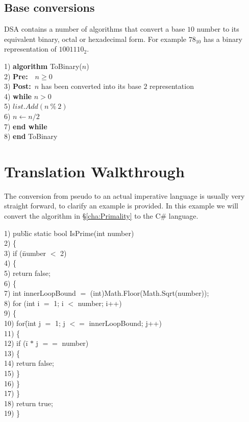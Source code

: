 \documentclass[10pt,oneside,a4paper]{report}
\begin{document}
\section{Base conversions}
DSA contains a number of algorithms that convert a base $10$ number to its equivalent binary, octal or hexadecimal form. For example $78_{10}$ has a binary representation of $1001110_{2}$.

\begin{tabbing}
1) \textbf{alg}\= \textbf{orithm} ToBinary($n$)\\
2) \> \textbf{Pre:}~~$n \geq 0$ \\
3) \> \textbf{Post:}~$n$ has been converted into its base $2$ representation \\
4) \> \textbf{whi}\= \textbf{le} $n > 0$\\
5) \> \> $list.Add(n~\%~2)$\\
6) \> \> $n \leftarrow n / 2$\\
7) \> \textbf{end while}\\
8) \textbf{end} ToBinary\\
\end{tabbing}

\appendix
\chapter{Translation Walkthrough}
The conversion from pseudo to an actual imperative language is usually very straight forward, to clarify an example is provided.
In this example we will convert the algorithm in \S\ref{cha:Primality} to the C\# language.

\begin{tabbing}
1) pub\=lic static bool IsPrime(int number) \\
2) \{ \\
3) \> if (\=number $<$ 2) \\
4) \> \{ \\
5) \> \> return false; \\
6) \> \{ \\ 
7) \> int innerLoopBound $=$ (int)Math.Floor(Math.Sqrt(number)); \\
8) \> for (int i $=$ 1; i $<$ number; i++) \\
9) \> \{ \\
10) \> \> for\= (int j $=$ 1; j $<=$ innerLoopBound; j++) \\
11) \> \> \{ \\
12) \> \> \> if (\=i $*$ j $==$ number) \\
13) \> \> \> \{ \\
14) \> \> \> \> return false; \\
15) \> \> \> \} \\
16) \> \> \} \\
17) \> \} \\
18) \> return true; \\
19) \} \\
\end{tabbing}
\end{document}

